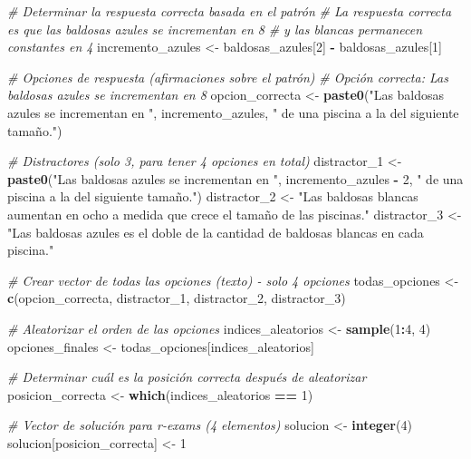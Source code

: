 \documentclass[
]{article}
\newenvironment{Shaded}{\begin{snugshade}}{\end{snugshade}}
\newcommand{\CommentTok}[1]{\textcolor[rgb]{0.56,0.35,0.01}{\textit{#1}}}
\newcommand{\DecValTok}[1]{\textcolor[rgb]{0.00,0.00,0.81}{#1}}
\newcommand{\FunctionTok}[1]{\textcolor[rgb]{0.13,0.29,0.53}{\textbf{#1}}}
\newcommand{\NormalTok}[1]{#1}
\newcommand{\OtherTok}[1]{\textcolor[rgb]{0.56,0.35,0.01}{#1}}
\newcommand{\SpecialCharTok}[1]{\textcolor[rgb]{0.81,0.36,0.00}{\textbf{#1}}}
\newcommand{\StringTok}[1]{\textcolor[rgb]{0.31,0.60,0.02}{#1}}
\begin{document}
\begin{Shaded}
\begin{Highlighting}[]
  \CommentTok{\# Determinar la respuesta correcta basada en el patrón}
  \CommentTok{\# La respuesta correcta es que las baldosas azules se incrementan en 8}
  \CommentTok{\# y las blancas permanecen constantes en 4}
\NormalTok{  incremento\_azules }\OtherTok{\textless{}{-}}\NormalTok{ baldosas\_azules[}\DecValTok{2}\NormalTok{] }\SpecialCharTok{{-}}\NormalTok{ baldosas\_azules[}\DecValTok{1}\NormalTok{]}
  
  \CommentTok{\# Opciones de respuesta (afirmaciones sobre el patrón)}
  \CommentTok{\# Opción correcta: Las baldosas azules se incrementan en 8}
\NormalTok{  opcion\_correcta }\OtherTok{\textless{}{-}} \FunctionTok{paste0}\NormalTok{(}\StringTok{"Las baldosas azules se incrementan en "}\NormalTok{, incremento\_azules, }\StringTok{" de una piscina a la del siguiente tamaño."}\NormalTok{)}
  
  \CommentTok{\# Distractores (solo 3, para tener 4 opciones en total)}
\NormalTok{  distractor\_1 }\OtherTok{\textless{}{-}} \FunctionTok{paste0}\NormalTok{(}\StringTok{"Las baldosas azules se incrementan en "}\NormalTok{, incremento\_azules }\SpecialCharTok{{-}} \DecValTok{2}\NormalTok{, }\StringTok{" de una piscina a la del siguiente tamaño."}\NormalTok{)}
\NormalTok{  distractor\_2 }\OtherTok{\textless{}{-}} \StringTok{"Las baldosas blancas aumentan en ocho a medida que crece el tamaño de las piscinas."}
\NormalTok{  distractor\_3 }\OtherTok{\textless{}{-}} \StringTok{"Las baldosas azules es el doble de la cantidad de baldosas blancas en cada piscina."}
  
  \CommentTok{\# Crear vector de todas las opciones (texto) {-} solo 4 opciones}
\NormalTok{  todas\_opciones }\OtherTok{\textless{}{-}} \FunctionTok{c}\NormalTok{(opcion\_correcta, distractor\_1, distractor\_2, distractor\_3)}
  
  \CommentTok{\# Aleatorizar el orden de las opciones}
\NormalTok{  indices\_aleatorios }\OtherTok{\textless{}{-}} \FunctionTok{sample}\NormalTok{(}\DecValTok{1}\SpecialCharTok{:}\DecValTok{4}\NormalTok{, }\DecValTok{4}\NormalTok{)}
\NormalTok{  opciones\_finales }\OtherTok{\textless{}{-}}\NormalTok{ todas\_opciones[indices\_aleatorios]}
  
  \CommentTok{\# Determinar cuál es la posición correcta después de aleatorizar}
\NormalTok{  posicion\_correcta }\OtherTok{\textless{}{-}} \FunctionTok{which}\NormalTok{(indices\_aleatorios }\SpecialCharTok{==} \DecValTok{1}\NormalTok{)}
  
  \CommentTok{\# Vector de solución para r{-}exams (4 elementos)}
\NormalTok{  solucion }\OtherTok{\textless{}{-}} \FunctionTok{integer}\NormalTok{(}\DecValTok{4}\NormalTok{)}
\NormalTok{  solucion[posicion\_correcta] }\OtherTok{\textless{}{-}} \DecValTok{1}
  

\end{Highlighting}
\end{Shaded}
\end{document}
